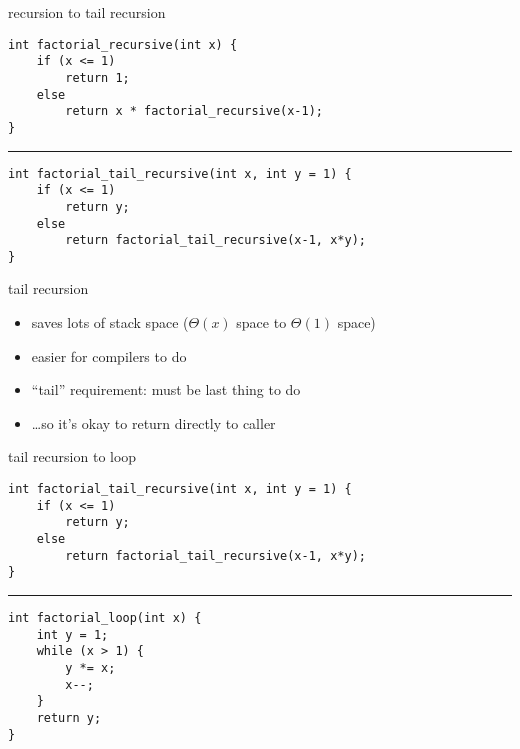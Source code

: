 \begin{frame}[fragile,label=recurseToTail]{recursion to tail recursion}
\lstset{language=C++,style=smaller}
\begin{lstlisting}
int factorial_recursive(int x) {
    if (x <= 1)
        return 1;
    else
        return x * factorial_recursive(x-1);
}
\end{lstlisting}
\hrule
\begin{lstlisting}
int factorial_tail_recursive(int x, int y = 1) {
    if (x <= 1)
        return y;
    else
        return factorial_tail_recursive(x-1, x*y);
}
\end{lstlisting}
\end{frame}

\begin{frame}[fragile,label=noCall]{tail recursion: avoiding call}
}
\begin{lstlisting}
factorial_tail_recursive:
  cmp edi, 1
  jle .L4
.L2:
  imul esi, edi
  sub edi, 1
  @2jmp factorial_tail_recursive2@
  // same effect as:
  // call factorial_tail_recursive
  // ret
.L4:
  mov eax, esi
  ret
\end{lstlisting}
\end{frame}

\begin{frame}{tail recursion}
\begin{itemize}
    \item saves lots of stack space ($\Theta(x)$ space to $\Theta(1)$ space)
    \item easier for compilers to do
    \vspace{.5cm}
    \item ``tail'' requirement: must be last thing to do
    \item \ldots so it's okay to return directly to caller
\end{itemize}
\end{frame}

\begin{frame}[fragile,label=tailToLoop]{tail recursion to loop}
\lstset{language=C++,style=smaller}
\begin{lstlisting}
int factorial_tail_recursive(int x, int y = 1) {
    if (x <= 1)
        return y;
    else
        return factorial_tail_recursive(x-1, x*y);
}
\end{lstlisting}
\hrule
\begin{lstlisting}
int factorial_loop(int x) {
    int y = 1;
    while (x > 1) {
        y *= x;
        x--;
    }
    return y;
}
\end{lstlisting}
\end{frame}
